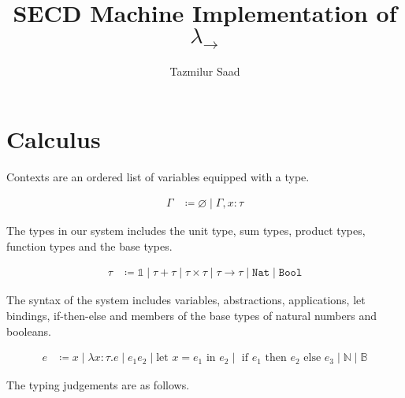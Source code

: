 \documentclass[]{acmart}
\newcommand{\nat}{\texttt{Nat}}
\newcommand{\bool}{\texttt{Bool}}
\begin{document}
  \title{SECD Machine Implementation of $\lambda_{\rightarrow}$}


  \author{Tazmilur Saad}

  \makeatletter\@printpermissionfalse\makeatother
  \makeatletter\@printcopyrightfalse\makeatother


  \maketitle

  \section{Calculus}

  Contexts are an ordered list of variables equipped with a type.

  \vspace*{-2em}
  \begin{align*}
    \Gamma &\coloneq \varnothing \mid \Gamma, x : \tau
  \end{align*}

  The types in our system includes the unit type, sum types, product types, function types
  and the base types.

  \vspace*{-2em}
  \begin{align*}
    \tau &\coloneq \mathds{1} \mid \tau + \tau \mid \tau \times\tau \mid \tau \rightarrow \tau \mid \nat \mid \bool
  \end{align*}

  The syntax of the system includes variables, abstractions, applications,
  let bindings, if-then-else and members of the base types of natural numbers and
  booleans.

  \vspace*{-2em}
  \begin{align*}
    e &\coloneq x \mid \lambda x : \tau . e \mid e_{1} e_{2} \mid \text{let } x = e_1 \text{ in } e_2 \mid
                \text{ if } e_1 \text{ then } e_2 \text{ else } e_3 \mid \mathds{N} \mid \mathds{B}
  \end{align*}

  The typing judgements are as follows.
\end{document}
